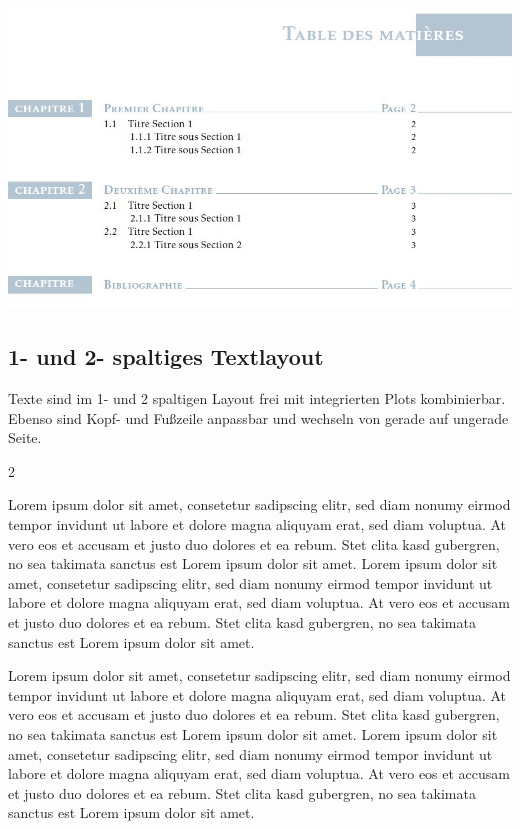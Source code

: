 \documentclass[
  a4paper,
  twoside]{article}
\begin{document}
\includegraphics{B8obV.jpg}

\newpage

\hypertarget{und-2--spaltiges-textlayout}{%
\subsection{1- und 2- spaltiges Textlayout}\label{und-2--spaltiges-textlayout}}

Texte sind im 1- und 2 spaltigen Layout frei mit integrierten Plots kombinierbar. Ebenso sind Kopf- und Fußzeile anpassbar und wechseln von gerade auf ungerade Seite.

\begin {multicols}{2}

Lorem ipsum dolor sit amet, consetetur sadipscing elitr, sed diam nonumy eirmod tempor invidunt ut labore et dolore magna aliquyam erat, sed diam voluptua. At vero eos et accusam et justo duo dolores et ea rebum. Stet clita kasd gubergren, no sea takimata sanctus est Lorem ipsum dolor sit amet. Lorem ipsum dolor sit amet, consetetur sadipscing elitr, sed diam nonumy eirmod tempor invidunt ut labore et dolore magna aliquyam erat, sed diam voluptua. At vero eos et accusam et justo duo dolores et ea rebum. Stet clita kasd gubergren, no sea takimata sanctus est Lorem ipsum dolor sit amet.

\columnbreak

Lorem ipsum dolor sit amet, consetetur sadipscing elitr, sed diam nonumy eirmod tempor invidunt ut labore et dolore magna aliquyam erat, sed diam voluptua. At vero eos et accusam et justo duo dolores et ea rebum. Stet clita kasd gubergren, no sea takimata sanctus est Lorem ipsum dolor sit amet. Lorem ipsum dolor sit amet, consetetur sadipscing elitr, sed diam nonumy eirmod tempor invidunt ut labore et dolore magna aliquyam erat, sed diam voluptua. At vero eos et accusam et justo duo dolores et ea rebum. Stet clita kasd gubergren, no sea takimata sanctus est Lorem ipsum dolor sit amet.

\end {multicols}
\end{document}
